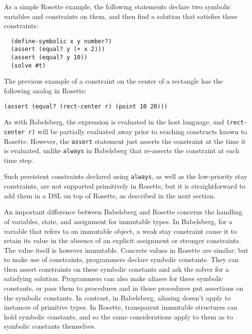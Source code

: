 \documentclass{sig-alternate-05-2015}
\begin{document}
As a simple Rosette example, the following statements declare two symbolic
variables and constraints on them, and then find a solution that satisfies
these constraints:
\begin{verbatim}
  (define-symbolic x y number?)
  (assert (equal? y (+ x 2)))
  (assert (equal? y 10))
  (solve #t)
\end{verbatim}

The previous example of a constraint on the center of a rectangle has
the following analog in Rosette:
\nopagebreak[3]
\begin{verbatim}
(assert (equal? (rect-center r) (point 10 20)))
\end{verbatim}

\pagebreak

As with Babelsberg, the expression is evaluated in the host language, and
\verb|(rect-center r)| will be partially evaluated away prior to reaching
constructs known to Rosette.  
However, the \verb|assert| statement just asserts the constraint at the
time it is evaluated, unlike \verb|always| in Babelsberg that re-asserts
the constraint at each time step.

Such persistent constraints declared using \verb|always|, as well as
the low-priority stay constraints, are not supported primitively in
Rosette, but it is straightforward to add them in a DSL on top of
Rosette, as described in the next section.

An important difference between Babelsberg and Rosette concerns the
handling of variables, state, and assignment for immutable types.  In
Babelsberg, for a variable that refers to an immutable object, a weak stay
constraint cause it to retain its value in the absence of an explicit
assignment or stronger constraints.  The value itself is however immutable.
Concrete values in Rosette are similar; but to make use of constraints,
programmers declare symbolic constants.  They can then assert constraints
on these symbolic constants and ask the solver for a satisfying solution.
Programmers can also make aliases for these symbolic constants, or pass
them to procedures and in those procedures put assertions on the symbolic
constants.  In contrast, in Babelsberg, aliasing doesn't apply to instances
of primitive types.  In Rosette, transparent immutable structures can hold
symbolic constants, and so the same considerations apply to them as to
symbolic constants themselves.  
\end{document}
